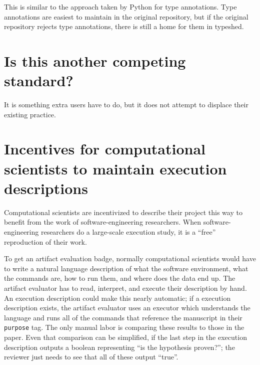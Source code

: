 \documentclass[manuscript,authordraft]{acmart}
\begin{document}
This is similar to the approach taken by Python for type annotations.
Type annotations are easiest to maintain in the original repository, but
if the original repository rejects type annotations, there is still a
home for them in typeshed.

\hypertarget{is-this-another-competing-standard}{%
\section{Is this another competing
standard?}\label{is-this-another-competing-standard}}

It is something extra users have to do, but it does not attempt to
displace their existing practice.

\hypertarget{incentives-for-computational-scientists-to-maintain-execution-descriptions}{%
\section{Incentives for computational scientists to maintain execution
descriptions}\label{incentives-for-computational-scientists-to-maintain-execution-descriptions}}

Computational scientists are incentivized to describe their project this
way to benefit from the work of software-engineering researchers. When
software-engineering researchers do a large-scale execution study, it is
a ``free'' reproduction of their work.

To get an artifact evaluation badge, normally computational scientists
would have to write a natural language description of what the software
environment, what the commands are, how to run them, and where does the
data end up. The artifact evaluator has to read, interpret, and execute
their description by hand. An execution description could make this
nearly automatic; if a execution description exists, the artifact
evaluator uses an executor which understands the language and runs all
of the commands that reference the manuscript in their \texttt{purpose}
tag. The only manual labor is comparing these results to those in the
paper. Even that comparison can be simplified, if the last step in the
execution description outputs a boolean representing ``is the hypothesis
proven?''; the reviewer just needs to see that all of these output
``true''.



%


\end{document}
